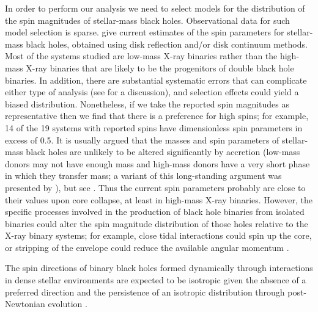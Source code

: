 \documentclass[modern,linenumbers]{aastex61}
\begin{document}
In order to perform our analysis we need to select models for the
distribution of the spin magnitudes of stellar-mass black holes.
Observational data for such model selection is sparse.
\citet{2015PhR...548....1M} give current estimates of the spin
parameters for stellar-mass black holes, obtained using disk
reflection and/or disk continuum methods.  Most of the systems studied
are low-mass X-ray binaries rather than the high-mass X-ray binaries
that are likely to be the progenitors of double black hole binaries.
In addition, there are substantial systematic errors that can
complicate either type of analysis (see \citealt{2015PhR...548....1M}
for a discussion), and selection effects could yield a biased
distribution. Nonetheless, if we take the reported spin magnitudes as
representative then we find that there is a preference for high spins;
for example, 14 of the 19 systems with reported spins have
dimensionless spin parameters in excess of 0.5.  It is usually argued
that the masses and spin parameters of stellar-mass black holes are
unlikely to be altered significantly by accretion (low-mass donors may
not have enough mass and high-mass donors have a very short phase in
which they transfer mass; a variant of this long-standing argument was
presented by \citet{1999MNRAS.305..654K}), but see
\citet{2003MNRAS.341..385P,2015ApJ...800...17F}.  Thus the current
spin parameters probably are close to their values upon core collapse,
at least in high-mass X-ray binaries.  However, the specific processes
involved in the production of black hole binaries from isolated
binaries could alter the spin magnitude distribution of those holes
relative to the X-ray binary systems; for example, close tidal
interactions could spin up the core, or stripping of the envelope
could reduce the available angular momentum
\citep{2016MNRAS.462..844K,2017arXiv170200885Z,2017arXiv170203952H}.

The spin directions of binary black holes formed dynamically through
interactions in dense stellar environments
\citep{SigurdssonHernquist:1993,1993Natur.364..421K,PZMcMillan:2000,Rodriguez:2015,Stone:2016}
are expected to be isotropic given the absence of a preferred
direction \citep[e.g.,][]{2016ApJ...832L...2R} and the persistence of
an isotropic distribution through post-Newtonian evolution
\citep{2004PhRvD..70l4020S,2007ApJ...661L.147B}.
\end{document}
